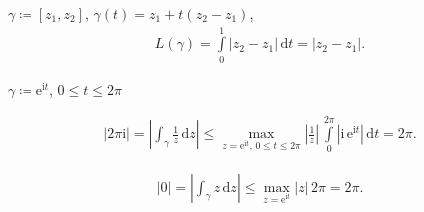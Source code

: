 \begin{example}
  \begin{enum-arab}
    \item $\gamma \coloneq [z_1,z_2]$, $\gamma(t) = z_1 + t(z_2 - z_1)$,
    \begin{align*}
      L(\gamma) = \int\limits_{0}^{1} |z_2 - z_1| \, \mathrm{d}t = |z_2 - z_1|.
    \end{align*}
    
    \item $\gamma \coloneq \mathrm{e}^{\mathrm{i} t}$, $0 \leq t \leq 2 \pi$
    \begin{enum-alph}
      \item
      \begin{align*}
        |2 \pi \mathrm{i}| = \left| \int_\gamma \frac{1}{z} \, \mathrm{d}z \right| \leq \max\limits_{z = \mathrm{e}^{\mathrm{i} t},\, 0 \leq t \leq 2 \pi} \left| \frac{1}{z} \right| \, \int\limits_{0}^{2 \pi} \left| \mathrm{i} \,  \mathrm{e}^{\mathrm{i} t} \right| \, \mathrm{d}t = 2 \pi.
      \end{align*}
      
      \item
      \begin{align*}
        |0| = \left| \int_\gamma z \, \mathrm{d}z \right| \leq \max\limits_{z = \mathrm{e}^{\mathrm{i} t}} |z| \, 2 \pi = 2 \pi.
      \end{align*}
    \end{enum-alph}
  \end{enum-arab}
\end{example}

